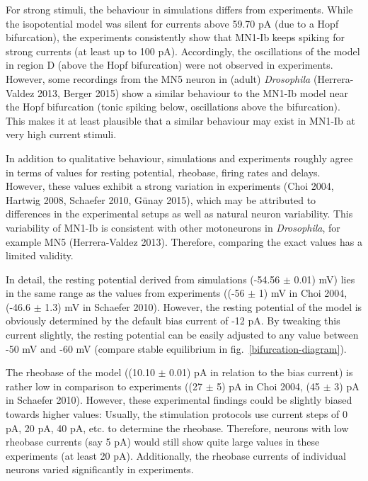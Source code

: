\documentclass[12pt,a4paper,]{report}
\begin{document}
For strong stimuli, the behaviour in simulations differs from
experiments. While the isopotential model was silent for currents above
59.70 pA (due to a Hopf bifurcation), the experiments consistently show
that MN1-Ib keeps spiking for strong currents (at least up to 100 pA).
Accordingly, the oscillations of the model in region D (above the Hopf
bifurcation) were not observed in experiments. However, some recordings
from the MN5 neuron in (adult) \emph{Drosophila} (Herrera-Valdez 2013,
Berger 2015) show a similar behaviour to the MN1-Ib model near the Hopf
bifurcation (tonic spiking below, oscillations above the bifurcation).
This makes it at least plausible that a similar behaviour may exist in
MN1-Ib at very high current stimuli.

In addition to qualitative behaviour, simulations and experiments
roughly agree in terms of values for resting potential, rheobase, firing
rates and delays. However, these values exhibit a strong variation in
experiments (Choi 2004, Hartwig 2008, Schaefer 2010, Günay 2015), which
may be attributed to differences in the experimental setups as well as
natural neuron variability. This variability of MN1-Ib is consistent
with other motoneurons in \emph{Drosophila}, for example MN5
(Herrera-Valdez 2013). Therefore, comparing the exact values has a
limited validity.

In detail, the resting potential derived from simulations (-54.56 $\pm$
0.01) mV) lies in the same range as the values from experiments ((-56
$\pm$ 1) mV in Choi 2004, (-46.6 $\pm$ 1.3) mV in Schaefer 2010).
However, the resting potential of the model is obviously determined by
the default bias current of -12 pA. By tweaking this current slightly,
the resting potential can be easily adjusted to any value between -50 mV
and -60 mV (compare stable equilibrium in
fig.~\ref{bifurcation-diagram}).

The rheobase of the model ((10.10 $\pm$ 0.01) pA in relation to the bias
current) is rather low in comparison to experiments ((27 $\pm$ 5) pA in
Choi 2004, (45 $\pm$ 3) pA in Schaefer 2010). However, these
experimental findings could be slightly biased towards higher values:
Usually, the stimulation protocols use current steps of 0 pA, 20 pA, 40
pA, etc. to determine the rheobase. Therefore, neurons with low rheobase
currents (say 5 pA) would still show quite large values in these
experiments (at least 20 pA). Additionally, the rheobase currents of
individual neurons varied significantly in experiments.
\end{document}
